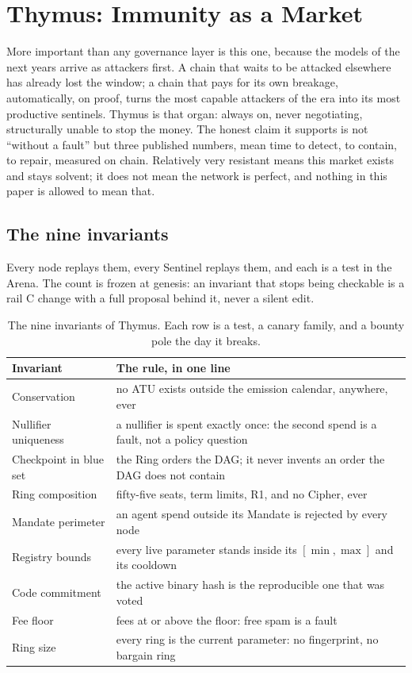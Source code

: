 
\section{Thymus: Immunity as a Market}\label{sec:thymus}

More important than any governance layer is this one, because
the models of the next years arrive as attackers first. A chain
that waits to be attacked elsewhere has already lost the window;
a chain that pays for its own breakage, automatically, on proof,
turns the most capable attackers of the era into its most
productive sentinels. Thymus is that organ: always on, never
negotiating, structurally unable to stop the money. The honest
claim it supports is not ``without a fault'' but three published
numbers, mean time to detect, to contain, to repair, measured on
chain. Relatively very resistant means this market exists and
stays solvent; it does not mean the network is perfect, and
nothing in this paper is allowed to mean that.

\subsection{The nine invariants}

Every node replays them, every Sentinel replays them, and each is
a test in the Arena. The count is frozen at genesis: an invariant
that stops being checkable is a rail C change with a full
proposal behind it, never a silent edit.

\begin{table}[htbp]
\centering
\small
\caption{The nine invariants of Thymus. Each row is a test, a
canary family, and a bounty pole the day it breaks.}
\label{tab:invariants}
\begin{tabularx}{\textwidth}{@{}L{5.2cm}Y@{}}
\toprule
Invariant & The rule, in one line \\
\midrule
Conservation & no ATU exists outside the emission calendar, anywhere, ever \\
Nullifier uniqueness & a nullifier is spent exactly once: the second spend is a fault, not a policy question \\
Checkpoint in blue set & the Ring orders the DAG; it never invents an order the DAG does not contain \\
Ring composition & fifty-five seats, term limits, R1, and no Cipher, ever \\
Mandate perimeter & an agent spend outside its Mandate is rejected by every node \\
Registry bounds & every live parameter stands inside its $[\min,\max]$ and its cooldown \\
Code commitment & the active binary hash is the reproducible one that was voted \\
Fee floor & fees at or above the floor: free spam is a fault \\
Ring size & every ring is the current parameter: no fingerprint, no bargain ring \\
\bottomrule
\end{tabularx}
\end{table}

